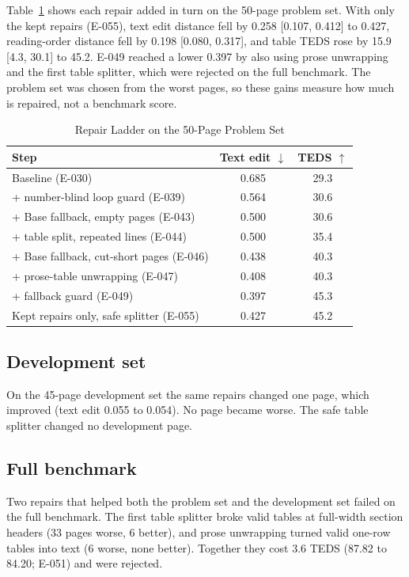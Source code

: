 \documentclass[journal]{IEEEtran}
\begin{document}
Table~\ref{tab:ladder} shows each repair added in turn on the 50-page problem
set. With only the kept repairs (E-055), text edit distance fell by 0.258
[0.107, 0.412] to 0.427, reading-order distance fell by 0.198 [0.080, 0.317], and
table TEDS rose by 15.9 [4.3, 30.1] to 45.2. E-049 reached a lower 0.397 by also
using prose unwrapping and the first table splitter, which were rejected on the
full benchmark. The problem set was chosen from the worst pages, so these gains
measure how much is repaired, not a benchmark score.

\begin{table}[!t]
\caption{Repair Ladder on the 50-Page Problem Set}
\label{tab:ladder}
\centering
\footnotesize
\setlength{\tabcolsep}{4pt}
\begin{tabular}{@{}lcc@{}}
\toprule
Step & Text edit $\downarrow$ & TEDS $\uparrow$ \\
\midrule
Baseline (E-030) & 0.685 & 29.3 \\
+ number-blind loop guard (E-039) & 0.564 & 30.6 \\
+ Base fallback, empty pages (E-043) & 0.500 & 30.6 \\
+ table split, repeated lines (E-044) & 0.500 & 35.4 \\
+ Base fallback, cut-short pages (E-046) & 0.438 & 40.3 \\
+ prose-table unwrapping (E-047) & 0.408 & 40.3 \\
+ fallback guard (E-049) & 0.397 & 45.3 \\
\midrule
Kept repairs only, safe splitter (E-055) & 0.427 & 45.2 \\
\bottomrule
\end{tabular}
\end{table}

\subsection{Development set}

On the 45-page development set the same repairs changed one page, which
improved (text edit 0.055 to 0.054). No page became worse. The safe table
splitter changed no development page.

\subsection{Full benchmark}
\label{sec:full}

Two repairs that helped both the problem set and the development set failed on
the full benchmark. The first table splitter broke valid tables at full-width
section headers (33 pages worse, 6 better), and prose unwrapping turned valid
one-row tables into text (6 worse, none better). Together they cost 3.6 TEDS
(87.82 to 84.20; E-051) and were rejected.
\end{document}
